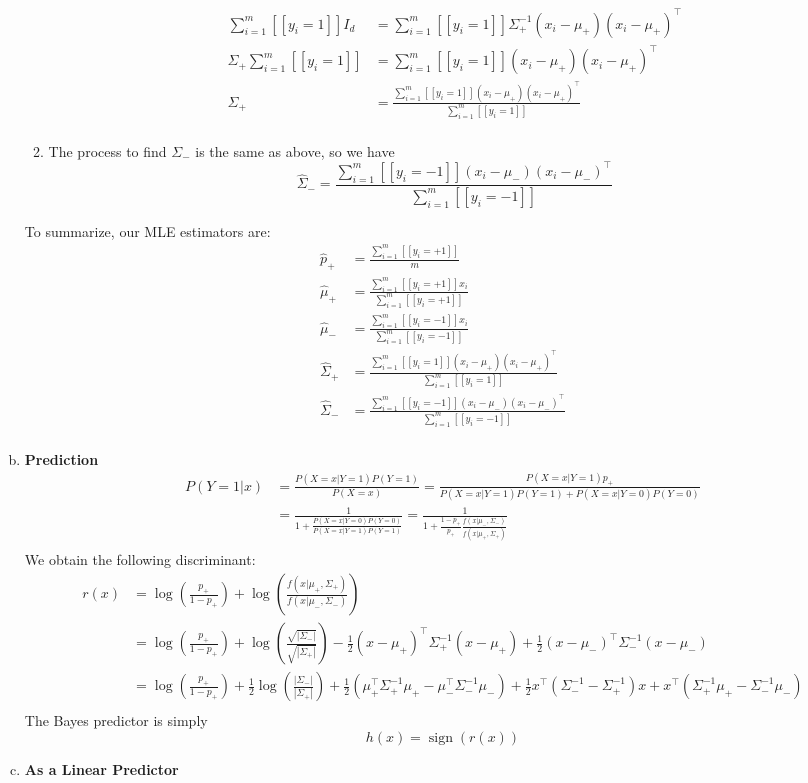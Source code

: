 \documentclass{amsart}
\DeclareMathOperator{\sign}{sign}
\theoremstyle{definition}
\begin{document}
\begin{enumerate}[(a)]
\begin{enumerate}
\begin{align*}
			\sum_{i=1}^{m}[[y_i = 1]]I_d &= \sum_{i=1}^{m} [[y_i = 1]]\Sigma_+^{-1}(x_i - \mu_+) (x_i-\mu_+)^\intercal\\
			\Sigma_+\sum_{i=1}^{m}[[y_i=1]] &= \sum_{i=1}^{m} [[y_i = 1]](x_i - \mu_+) (x_i-\mu_+)^\intercal\\
			\hat{\Sigma}_+ &= \frac{\sum_{i=1}^{m} [[y_i = 1]](x_i - \mu_+) (x_i-\mu_+)^\intercal}{\sum_{i=1}^{m}[[y_i = 1]]}\\
			\end{align*}
			\item The process to find $\Sigma_-$ is the same as above, so we have
			\[\hat{\Sigma}_- = \frac{\sum_{i=1}^{m}[[y_i = -1]] (x_i - \mu_-) (x_i-\mu_-)^\intercal}{\sum_{i=1}^{m}[[y_i = -1]]}\]
        \end{enumerate}
		To summarize, our MLE estimators are:
		\begin{align*}
			\hat{p}_+ &= \frac{\sum_{i=1}^{m}[[y_i = +1]]}{m}\\
			\hat{\mu}_+ &= \frac{\sum_{i=1}^{m}[[y_i = +1]] x_i}{\sum_{i=1}^{m}[[y_i = +1]]}\\
			\hat{\mu}_- &= \frac{\sum_{i=1}^{m}[[y_i = -1]] x_i}{\sum_{i=1}^{m}[[y_i = -1]]}\\
			\hat{\Sigma}_+ &= \frac{\sum_{i=1}^{m} [[y_i = 1]](x_i - \mu_+) (x_i-\mu_+)^\intercal}{\sum_{i=1}^{m}[[y_i = 1]]}\\
			\hat{\Sigma}_- &= \frac{\sum_{i=1}^{m}[[y_i = -1]] (x_i - \mu_-) (x_i-\mu_-)^\intercal}{\sum_{i=1}^{m}[[y_i = -1]]}\\
		\end{align*}
	\item {\bf Prediction}
		\begin{align*}
			P(Y = 1|x) &= \frac{P(X = x| Y= 1)P(Y=1)}{P(X = x)} = \frac{P(X = x|Y=1)p_+}{P(X=x|Y = 1)P(Y=1) + P(X = x|Y = 0)P(Y = 0)}\\
			&= \frac{1}{1 + \frac{P(X = x| Y = 0)P(Y = 0)}{P(X=x|Y=1)P(Y = 1)}} = \frac{1}{1 + \frac{1-p_+}{p_+}\frac{f(x|\mu_-, \Sigma_-)}{f(x|\mu_+, \Sigma_+)}}\\
		\end{align*}
		We obtain the following discriminant:
		\begin{align*}
			r(x) &= \log\left(\frac{p_+}{1-p_+}\right) + \log\left(\frac{f(x|\mu_+, \Sigma_+)}{f(x|\mu_-, \Sigma_-)}\right) \\
			&= \log\left(\frac{p_+}{1-p_+}\right) + \log\left(\frac{\sqrt{|\Sigma_-|}}{\sqrt{|\Sigma_+|}} \right) -\frac{1}{2}(x - \mu_+)^\intercal \Sigma_+^{-1}(x - \mu_+) + \frac12(x - \mu_-)^\intercal \Sigma_-^{-1}(x - \mu_-) \\ 
			&= \log\left(\frac{p_+}{1-p_+}\right) + \frac12 \log\left(\frac{|\Sigma_-|}{|\Sigma_+|}\right) + \frac{1}{2}(\mu_+^\intercal\Sigma_{+}^{-1}\mu_+ - \mu_-^\intercal\Sigma_{-}^{-1}\mu_-)+ \frac{1}{2}x^\intercal(\Sigma_{-}^{-1} - \Sigma_{+}^{-1})x + x^\intercal(\Sigma_+^{-1}\mu_+-\Sigma_-^{-1}\mu_-)\\
		\end{align*}
		The Bayes predictor is simply
		\[h(x) = \sign(r(x))\]
	\item {\bf As a Linear Predictor}
\end{enumerate}
\end{document}
